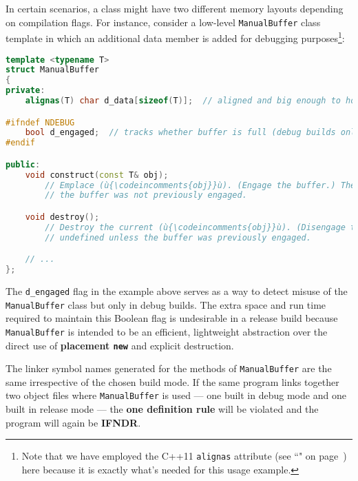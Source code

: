 In certain scenarios, a class might have two different memory layouts
depending on compilation flags. For instance, consider a low-level
\texttt{ManualBuffer} class template in which an additional data member
is added for debugging purposes{\cprotect\footnote{Note that we have
  employed the C++11 \texttt{alignas} attribute (see ``" on page~\pageref{alignas}) here
  because it is exactly what's needed for this usage example.}}:

\begin{lstlisting}[language=C++]
template <typename T>
struct ManualBuffer
{
private:
    alignas(T) char d_data[sizeof(T)];  // aligned and big enough to hold a (ù{\codeincomments{T}}ù)

#ifndef NDEBUG
    bool d_engaged;  // tracks whether buffer is full (debug builds only)
#endif

public:
    void construct(const T& obj);
        // Emplace (ù{\codeincomments{obj}}ù). (Engage the buffer.) The behavior is undefined unless
        // the buffer was not previously engaged.

    void destroy();
        // Destroy the current (ù{\codeincomments{obj}}ù). (Disengage the buffer.) The behavior is
        // undefined unless the buffer was previously engaged.

    // ...
};
\end{lstlisting}

\noindent The \texttt{d\_engaged} flag in the example above serves as a way to detect misuse of
the \mbox{\texttt{ManualBuffer}} class but only in debug builds. The extra
space and run time required to maintain this Boolean flag is undesirable
in a release build because \mbox{\texttt{ManualBuffer}} is intended to be an
efficient, lightweight abstraction over the direct use of
\textbf{placement \texttt{new}} and explicit destruction.

The linker symbol names generated for the methods of
\texttt{ManualBuffer} are the same irrespective of the chosen build
mode. If the same program links together two object files where
\texttt{ManualBuffer} is used --- one built in debug mode and one built
in release mode --- the \textbf{one definition rule} will be violated
and the program will again be \textbf{IFNDR}.

